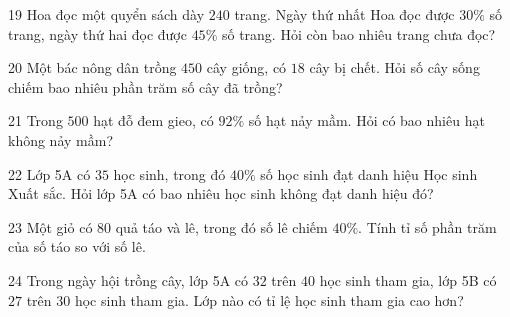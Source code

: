 \gap
\begin{probbox}{19}{\relax}
Hoa đọc một quyển sách dày $240$ trang. Ngày thứ nhất Hoa đọc được $30\%$ số trang, ngày thứ hai đọc được $45\%$ số trang. Hỏi còn bao nhiêu trang chưa đọc?
\end{probbox}
\gap
\begin{probbox}{20}{\relax}
Một bác nông dân trồng $450$ cây giống, có $18$ cây bị chết. Hỏi số cây sống chiếm bao nhiêu phần trăm số cây đã trồng?
\end{probbox}
\gap
\begin{probbox}{21}{\relax}
Trong $500$ hạt đỗ đem gieo, có $92\%$ số hạt nảy mầm. Hỏi có bao nhiêu hạt không nảy mầm?
\end{probbox}
\gap
\begin{probbox}{22}{\relax}
Lớp 5A có $35$ học sinh, trong đó $40\%$ số học sinh đạt danh hiệu Học sinh Xuất sắc. Hỏi lớp 5A có bao nhiêu học sinh không đạt danh hiệu đó?
\end{probbox}
\gap
\begin{probbox}{23}{\relax}
Một giỏ có $80$ quả táo và lê, trong đó số lê chiếm $40\%$. Tính tỉ số phần trăm của số táo so với số lê.
\end{probbox}
\gap
\begin{probbox}{24}{\relax}
Trong ngày hội trồng cây, lớp 5A có $32$ trên $40$ học sinh tham gia, lớp 5B có $27$ trên $30$ học sinh tham gia. Lớp nào có tỉ lệ học sinh tham gia cao hơn?
\end{probbox}
